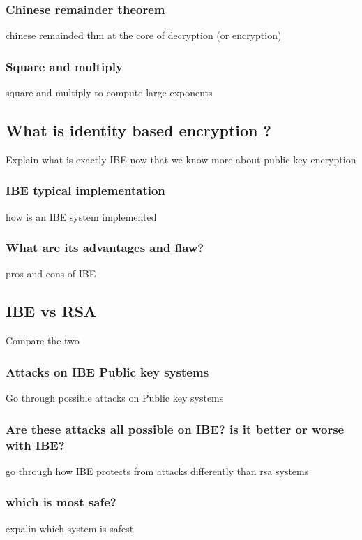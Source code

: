 \documentclass[conference]{IEEEtran}
\begin{document}
\subsubsection{Chinese remainder theorem}
chinese remainded thm at the core of decryption (or encryption)

\subsubsection{Square and multiply}
square and multiply to compute large exponents

\subsection{What is identity based encryption ?}
Explain what is exactly IBE now that we know more about public key encryption

\subsubsection{IBE typical implementation}
how is an IBE system implemented

\subsubsection{What are its advantages and flaw?}
pros and cons of IBE

\subsection{IBE vs RSA}
Compare the two

\subsubsection{Attacks on IBE Public key systems}
Go through possible attacks on Public key systems

\subsubsection{Are these attacks all possible on IBE? is it better or worse with IBE?}
go through how IBE protects from attacks differently than rsa systems

\subsubsection{which is most safe?}
expalin which system is safest
\end{document}
